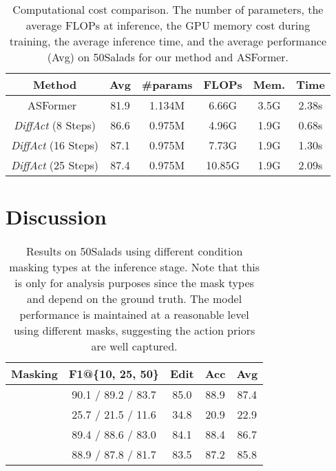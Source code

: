 \documentclass[10pt,twocolumn,letterpaper]{article}
\begin{document}
\begin{table}[t]
\begin{center}
\footnotesize
\begin{tabular}{c | c | c c c c}
\hline
Method & Avg & \#params & FLOPs & Mem. & Time\\
\hline
ASFormer~\cite{2021_BMVC_Yi} & 81.9 & 1.134M & 6.66G & 3.5G & 2.38s\\ 
{\textit{DiffAct}} (8 Steps) & 86.6 & 0.975M & 4.96G & 1.9G & 0.68s\\ 
{\textit{DiffAct}} (16 Steps) & 87.1 & 0.975M & 7.73G & 1.9G & 1.30s\\ 
{\textit{DiffAct}} (25 Steps) & 87.4 & 0.975M & 10.85G & 1.9G & 2.09s\\ 
\hline
\end{tabular}
\end{center}
\caption{Computational cost comparison. The number of parameters, the average FLOPs at inference, the GPU memory cost during training, the average inference time, and the average performance (Avg) on 50Salads for our method and ASFormer.}
\label{table:cost}
\end{table}



\section{Discussion}


\begin{table}[t]
\begin{center}
\footnotesize
\begin{tabular}{c | c c c c c c }
\hline
 Masking & \multicolumn{3}{c}{F1@\{10, 25, 50\}} & Edit & Acc & Avg \\
\hline
 & \multicolumn{3}{c}{ {90.1} / {89.2} / {83.7} } & {85.0} & {88.9} & {87.4}\\
 & \multicolumn{3}{c}{ 25.7 / 21.5 / 11.6 } & 34.8 & 20.9 & 22.9\\
 & \multicolumn{3}{c}{ 89.4 / 88.6 / 83.0 } & 84.1 & 88.4 & 86.7\\
 & \multicolumn{3}{c}{ 88.9 / 87.8 / 81.7 } & 83.5 & 87.2 & 85.8\\
\hline
\end{tabular}
\end{center}
\caption{Results on 50Salads using different condition masking types at the inference stage. Note that this is only for analysis purposes since the mask types  and  depend on the ground truth. The model performance is maintained at a reasonable level using different masks, suggesting the action priors are well captured.}
\label{table:ablation-mask-inference}
\end{table}
\end{document}
